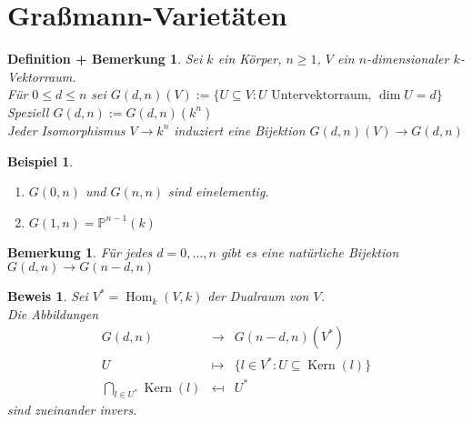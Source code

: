 \documentclass[a4paper,12pt]{report}
\theoremstyle{break}
\newtheorem{DefBem}[Def]{Definition + Bemerkung}
\newtheorem{Bem}[Def]{Bemerkung}
\theoremstyle{nonumberbreak}
\newtheorem{nnBsp}{Beispiel}
\newtheorem{Bew}{Beweis}
\theoremstyle{nonumberplain}
\newcommand{\quot}[1]{\textrm{\glqq}{#1}\textrm{\grqq}}
\DeclareMathOperator{\Hom}{Hom}
\DeclareMathOperator{\Kern}{Kern}
\newcommand{\IP}{\mathbb{P}}%
\begin{document}
\newpage


\section{Gra\ss mann-Variet\"aten}

\begin{DefBem}
Sei $k$ ein K\"orper, $n\ge1$, $V$ ein $n$-dimensionaler $k$-Vektorraum.\\
F\"ur $0\le d\le n$ sei $G(d,n)(V):=\{U\subseteq V:U \text{ Untervektorraum, } \dim U=d\}$\\
Speziell $G(d,n):=G(d,n)(k^n)$\\
Jeder Isomorphismus $V\to k^n$ induziert eine Bijektion $G(d,n)(V)\to G(d,n)$
\end{DefBem}

\begin{nnBsp}\begin{enumerate}[1)]
\item
	$G(0,n)$ und $G(n,n)$ sind einelementig.
\item
	$G(1,n)=\IP^{n-1}(k)$
\end{enumerate}\end{nnBsp}

\begin{Bem}
F\"ur jedes $d=0,\ldots ,n$ gibt es eine \quot{nat\"urliche} Bijektion $G(d,n)\to G(n-d,n)$
\end{Bem}

\begin{Bew}
Sei $V^*=\Hom_k(V,k)$ der Dualraum von $V$.\\
Die Abbildungen
	\[\begin{array}{rcl}
		G(d,n) &\to& G(n-d,n)(V^*)\\
		U &\mapsto& \{l\in V^* :U\subseteq \Kern(l)\}\\
		\bigcap\limits_{l\in U^*}\Kern(l) &\mapsfrom& U^*
	\end{array}\]
sind zueinander invers.
\end{Bew}
\end{document}
